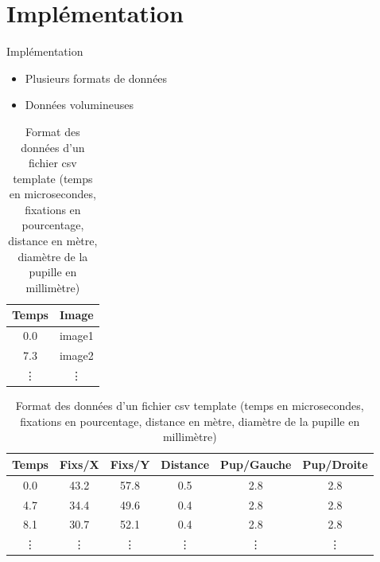 \documentclass{beamer}
\begin{document}
\section{Implémentation}
\begin{frame}{Implémentation}
  \begin{itemize}
    \item Plusieurs formats de données
    \item Données volumineuses
  \end{itemize}

  \begin{table}[htpb]
    \begin{adjustwidth}{0.05\textwidth}{0cm}
      \begin{tabular}{|c||c|}
        \hline
        Temps  & Image  \\
        \hline
        0.0    & image1 \\
        7.3    & image2 \\
        \vdots & \vdots \\
        \hline
      \end{tabular}
      \newline
      \begin{tabular}{|c||c|c|c|c|c|}
        \hline
        Temps  & Fixs/X & Fixs/Y & Distance & Pup/Gauche & Pup/Droite \\
        \hline
        0.0    & 43.2   & 57.8   & 0.5      & 2.8        & 2.8        \\
        4.7    & 34.4   & 49.6   & 0.4      & 2.8        & 2.8        \\
        8.1    & 30.7   & 52.1   & 0.4      & 2.8        & 2.8        \\
        \vdots & \vdots & \vdots & \vdots   & \vdots     & \vdots     \\
        \hline
      \end{tabular}
    \end{adjustwidth}
    \caption{\centering Format des données d'un fichier csv template
      (temps en microsecondes, fixations en pourcentage, distance en mètre,
      diamètre de la pupille en millimètre)}
  \end{table}
\end{frame}
\end{document}
